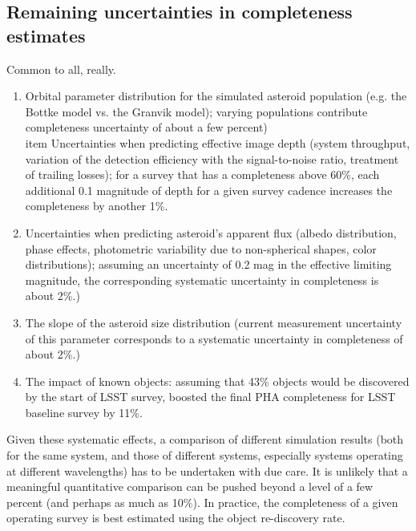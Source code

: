     
\subsection{Remaining uncertainties in completeness estimates}

Common to all, really.          

\begin{enumerate}
\item Orbital parameter distribution for the simulated asteroid population (e.g. the Bottke model
             vs. the Granvik model); varying populations contribute completeness uncertainty of about a few percent) 
\\item Uncertainties when predicting effective image depth (system throughput, variation of the detection efficiency
          with the signal-to-noise ratio, treatment of trailing losses); for a survey that has a completeness above 60\%, 
          each additional 0.1 magnitude of depth for a given survey cadence increases the completeness by another 1\%.
\item Uncertainties when predicting asteroid's apparent flux (albedo distribution, phase effects, photometric variability 
          due to non-spherical shapes, color distributions); assuming an uncertainty of 0.2 mag in the effective 
          limiting magnitude, the corresponding  systematic uncertainty in completeness is about 2\%.)
\item The slope of the asteroid size distribution (current measurement uncertainty of this parameter 
          corresponds to a systematic uncertainty in completeness of about 2\%.)
\item The impact of known objects: assuming that 43\% objects would be discovered by the start of
          LSST survey, \cite{GMS2016} boosted the final PHA completeness for LSST baseline survey by 11\%. 
\end{enumerate} 

Given these systematic effects, a comparison of different simulation results (both for the same system,
and those of different systems, especially systems operating at different wavelengths) has to be undertaken
with due care. It is unlikely that a meaningful quantitative comparison can be pushed beyond a level
of a few percent (and perhaps as much as 10\%). In practice, the completeness of a given operating survey
is best estimated using the object re-discovery rate. 

